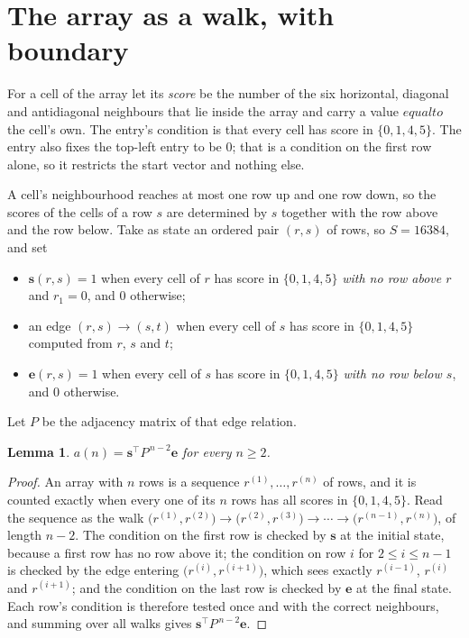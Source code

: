 \documentclass[11pt,a4paper]{article}
\theoremstyle{plain}
\newtheorem{lemma}[theorem]{Lemma}
\theoremstyle{definition}
\begin{document}
\section{The array as a walk, with boundary}

For a cell of the array let its \emph{score} be the number of the six horizontal, diagonal and antidiagonal neighbours that lie inside
the array and carry a value $equal to$ the cell's own. The entry's condition is that every cell
has score in $\{0,1,4,5\}$. The entry also fixes the top-left entry to be $0$; that is a condition on the first row alone, so it restricts the start vector and nothing else.

A cell's neighbourhood reaches at most one row up and one row down, so the scores of the
cells of a row $s$ are determined by $s$ together with the row above and the row below.
Take as state an ordered pair $(r,s)$ of rows, so $S=16384$, and set
\begin{itemize}
\item $\mathbf{s}(r,s)=1$ when every cell of $r$ has score in $\{0,1,4,5\}$ \emph{with no row
above $r$} and $r_1=0$, and $0$ otherwise;
\item an edge $(r,s)\to(s,t)$ when every cell of $s$ has score in $\{0,1,4,5\}$ computed from
$r$, $s$ and $t$;
\item $\mathbf{e}(r,s)=1$ when every cell of $s$ has score in $\{0,1,4,5\}$ \emph{with no row
below $s$}, and $0$ otherwise.
\end{itemize}
Let $P$ be the adjacency matrix of that edge relation.

\begin{lemma}\label{lem:walk}
$a(n)=\mathbf{s}^{\!\top}P^{\,n-2}\mathbf{e}$ for every $n\ge2$.
\end{lemma}

\begin{proof}
An array with $n$ rows is a sequence $r^{(1)},\dots,r^{(n)}$ of rows, and it is counted
exactly when every one of its $n$ rows has all scores in $\{0,1,4,5\}$. Read the sequence as the
walk $\bigl(r^{(1)},r^{(2)}\bigr)\to\bigl(r^{(2)},r^{(3)}\bigr)\to\cdots\to
\bigl(r^{(n-1)},r^{(n)}\bigr)$, of length $n-2$. The condition on the first row is
checked by $\mathbf{s}$ at the initial state, because a first row has no row above it; the
condition on row $i$ for $2\le i\le n-1$ is checked by the edge entering
$\bigl(r^{(i)},r^{(i+1)}\bigr)$, which sees exactly $r^{(i-1)}$, $r^{(i)}$ and
$r^{(i+1)}$; and the condition on the last row is checked by $\mathbf{e}$ at the final
state. Each row's condition is therefore tested once and with the correct neighbours, and
summing over all walks gives $\mathbf{s}^{\!\top}P^{\,n-2}\mathbf{e}$.
\end{proof}
\end{document}
